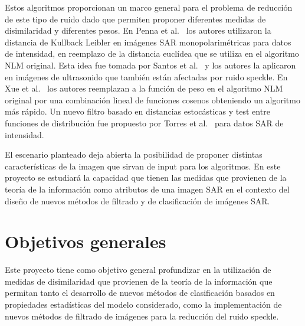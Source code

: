 \documentclass[11pt]{article}
\begin{document}
Estos algoritmos proporcionan un marco general para el problema de reducción de este tipo de ruido dado que permiten proponer diferentes medidas de disimilaridad y diferentes pesos. En Penna et al.~\cite{Penna2013} los autores utilizaron la distancia de Kullback Leibler en imágenes SAR monopolarimétricas para datos de intensidad, en reemplazo de la distancia euclídea que se utiliza en el algoritmo NLM original. Esta idea fue tomada por Santos et al.~\cite{Santos2017} y los autores la aplicaron en imágenes de ultrasonido que también están afectadas por ruido speckle. En Xue et al.~\cite{Xue2013} los autores reemplazan a la función de peso en el algoritmo NLM original por una combinación lineal de funciones cosenos obteniendo un algoritmo más rápido. Un nuevo filtro basado en distancias estocásticas y test entre funciones de distribución fue propuesto por Torres et al.~\cite{Torres2012} para datos SAR de intensidad.

El escenario planteado deja abierta la posibilidad de proponer distintas características de la imagen que sirvan de input para los algoritmos. En este proyecto se estudiará la capacidad que tienen las medidas que provienen de la teoría de la información como atributos de una imagen SAR en el contexto del diseño de nuevos métodos de filtrado y de clasificación de imágenes SAR.



\section{Objetivos generales}



Este proyecto tiene como objetivo general profundizar en la utilización de medidas de disimilaridad que provienen de la teoría de la información que permitan tanto el desarrollo de nuevos métodos de clasificación basados en propiedades estadísticas del modelo considerado, como la implementación de nuevos métodos de filtrado de imágenes para la reducción del ruido speckle.
\end{document}
